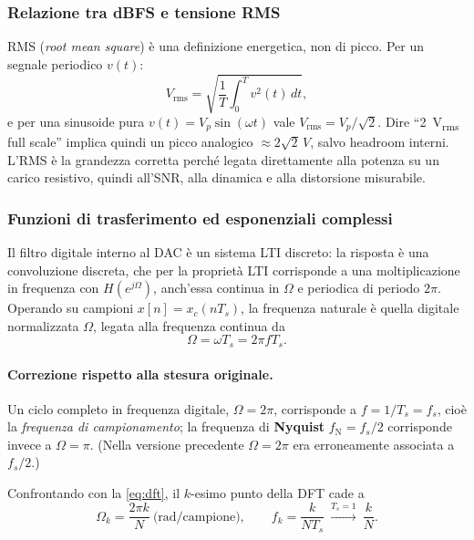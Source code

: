 \subsubsection{Relazione tra \texorpdfstring{\si{dBFS}}{dBFS} e tensione RMS}
RMS (\emph{root mean square}) è una definizione energetica, non di picco.
Per un segnale periodico $v(t)$:
\begin{equation}
  V_{\mathrm{rms}}=\sqrt{\frac{1}{T}\int_0^T v^2(t)\,dt},
\end{equation}
e per una sinusoide pura $v(t)=V_p\sin(\omega t)$ vale
$V_{\mathrm{rms}}=V_p/\sqrt2$. Dire ``\SI{2}{V_{rms}} full scale'' implica
quindi un picco analogico $\approx2\sqrt2\,\si{V}$, salvo headroom
interni. L'RMS è la grandezza corretta perché legata direttamente alla
potenza su un carico resistivo, quindi all'SNR, alla dinamica e alla
distorsione misurabile.

\subsubsection{Funzioni di trasferimento ed esponenziali complessi}\label{sec:filter}
Il filtro digitale interno al DAC è un sistema LTI discreto: la risposta è
una convoluzione discreta, che per la proprietà LTI corrisponde a una
moltiplicazione in frequenza con $H(e^{j\Omega})$, anch'essa continua in
$\Omega$ e periodica di periodo $2\pi$. Operando su campioni
$x[n]=x_c(nT_s)$, la frequenza naturale è quella digitale normalizzata
$\Omega$, legata alla frequenza continua da
\begin{equation}
  \Omega=\omega T_s=2\pi f T_s .
\end{equation}

\paragraph{Correzione rispetto alla stesura originale.} Un ciclo completo
in frequenza digitale, $\Omega=2\pi$, corrisponde a $f=1/T_s=f_s$, cioè la
\emph{frequenza di campionamento}; la frequenza di \textbf{Nyquist}
$f_{\mathrm{N}}=f_s/2$ corrisponde invece a $\Omega=\pi$. (Nella versione
precedente $\Omega=2\pi$ era erroneamente associata a $f_s/2$.)

Confrontando con la \eqref{eq:dft}, il $k$-esimo punto della DFT cade a
\begin{equation}
  \Omega_k=\frac{2\pi k}{N}\ \text{(rad/campione)},\qquad
  f_k=\frac{k}{NT_s}\ \xrightarrow{T_s=1}\ \frac{k}{N}.
\end{equation}

